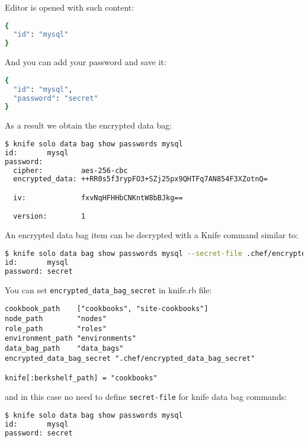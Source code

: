 Editor is opened with such content:

\begin{lstlisting}[language=Bash,label=lst:my-cloud-chef-databag20]
{
  "id": "mysql"
}
\end{lstlisting}

And you can add your password and save it:

\begin{lstlisting}[language=Bash,label=lst:my-cloud-chef-databag21]
{
  "id": "mysql",
  "password": "secret"
}
\end{lstlisting}

As a result we obtain the encrypted data bag:

\begin{lstlisting}[language=Bash,label=lst:my-cloud-chef-databag7]
$ knife solo data bag show passwords mysql
id:       mysql
password:
  cipher:         aes-256-cbc
  encrypted_data: ++RR0s5f3rypFO3+SZj25px9QHTFq7AN854F3XZotnQ=

  iv:             fxvNqHFHHbCNKntW8bBJkg==

  version:        1
\end{lstlisting}

An encrypted data bag item can be decrypted with a Knife command similar to:

\begin{lstlisting}[language=Bash,label=lst:my-cloud-chef-databag8,title=my-cloud/Gemfile]
$ knife solo data bag show passwords mysql --secret-file .chef/encrypted_data_bag_secret
id:       mysql
password: secret
\end{lstlisting}

You can set \lstinline!encrypted_data_bag_secret! in knife.rb file:

\begin{lstlisting}[label=lst:my-cloud-chef-databag9,title=my-cloud/.chef/knife.rb]
cookbook_path    ["cookbooks", "site-cookbooks"]
node_path        "nodes"
role_path        "roles"
environment_path "environments"
data_bag_path    "data_bags"
encrypted_data_bag_secret ".chef/encrypted_data_bag_secret"

knife[:berkshelf_path] = "cookbooks"
\end{lstlisting}

and in this case no need to define \lstinline!secret-file! for knife data bag commands:

\begin{lstlisting}[language=Bash,label=lst:my-cloud-chef-databag11]
$ knife solo data bag show passwords mysql
id:       mysql
password: secret
\end{lstlisting}

